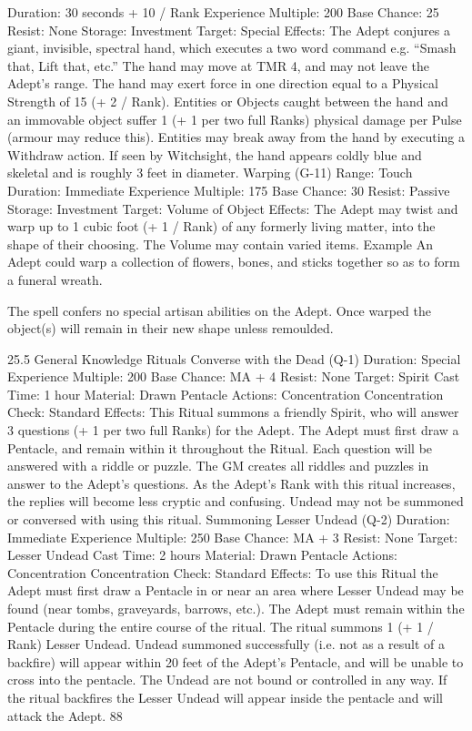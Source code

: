 \documentclass[a4paper]{article}
\begin{document}
\begin{multicols}{3}
Duration: 30 seconds + 10 / Rank
Experience Multiple: 200
Base Chance: 25%
Resist: None
Storage: Investment
Target: Special
Effects: The Adept conjures a giant, invisible,
spectral hand, which executes a two word command e.g. “Smash that, Lift that, etc.” The hand
may move at TMR 4, and may not leave the
Adept’s range. The hand may exert force in one
direction equal to a Physical Strength of 15 (+ 2 /
Rank). Entities or Objects caught between the hand
and an immovable object suffer 1 (+ 1 per two full
Ranks) physical damage per Pulse (armour may
reduce this). Entities may break away from the
hand by executing a Withdraw action. If seen by
Witchsight, the hand appears coldly blue and skeletal and is roughly 3 feet in diameter.
Warping (G-11)
Range: Touch
Duration: Immediate
Experience Multiple: 175
Base Chance: 30%
Resist: Passive
Storage: Investment
Target: Volume of Object
Effects: The Adept may twist and warp up to 1
cubic foot (+ 1 / Rank) of any formerly living
matter, into the shape of their choosing. The Volume may contain varied items.
Example
An Adept could warp a collection of flowers, bones, and sticks together so as to form a funeral
wreath.

The spell confers no special artisan abilities on the
Adept. Once warped the object(s) will remain in
their new shape unless remoulded.

25.5 General Knowledge Rituals
Converse with the Dead (Q-1)
Duration: Special
Experience Multiple: 200
Base Chance: MA + 4%
Resist: None
Target: Spirit
Cast Time: 1 hour
Material: Drawn Pentacle
Actions: Concentration
Concentration Check: Standard
Effects: This Ritual summons a friendly Spirit, who
will answer 3 questions (+ 1 per two full Ranks)
for the Adept. The Adept must first draw a Pentacle, and remain within it throughout the Ritual.
Each question will be answered with a riddle or
puzzle. The GM creates all riddles and puzzles in
answer to the Adept’s questions. As the Adept’s
Rank with this ritual increases, the replies will
become less cryptic and confusing. Undead may
not be summoned or conversed with using this
ritual.
Summoning Lesser Undead (Q-2)
Duration: Immediate
Experience Multiple: 250
Base Chance: MA + 3%
Resist: None
Target: Lesser Undead
Cast Time: 2 hours
Material: Drawn Pentacle
Actions: Concentration
Concentration Check: Standard
Effects: To use this Ritual the Adept must first
draw a Pentacle in or near an area where Lesser
Undead may be found (near tombs, graveyards,
barrows, etc.). The Adept must remain within the
Pentacle during the entire course of the ritual. The
ritual summons 1 (+ 1 / Rank) Lesser Undead.
Undead summoned successfully (i.e. not as a result
of a backfire) will appear within 20 feet of the
Adept’s Pentacle, and will be unable to cross into
the pentacle. The Undead are not bound or controlled in any way. If the ritual backfires the Lesser
Undead will appear inside the pentacle and will
attack the Adept.
88


\end{multicols}
\end{document}
